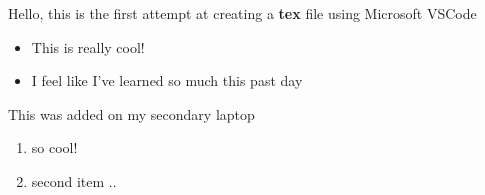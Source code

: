 \documentclass[10pt]{article}
\begin{document}
    \newpage
    Hello, this is the first attempt at creating a \textbf{tex} file using Microsoft VSCode
    \begin{itemize}
        \item This is really cool!
        \item I feel like I've learned so much this past day
    \end{itemize}
    This was added on my secondary laptop
    \begin{enumerate}
        \item so cool!
        \item second item ..
    \end{enumerate}
\end{document}
